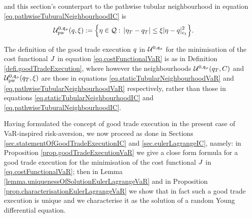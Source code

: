 \documentclass[10pt,a4paper]{article}
\begin{document}
	and  this section's counterpart to the pathwise tubular neighbourhood in equation \eqref{eq.pathwiseTuburalNeighbourhoodIC} is 
	\begin{equation}
	\begin{split}\label{eq.pathwiseTubularNeighbourhoodVaR}
	\mathcal{U}^{0,\mathfrak{q_0}}_{\text{pw}}(q,\xi):=
	\Big\lbrace
	\eta \in \mathcal{Q}: \, 
	\left\lvert {\eta_T-q_T} \right\rvert 
	&\leq \xi\lvert \eta - q\rvert ^{2}_{c_{1}}
	\Big\rbrace.
	\end{split}
	\end{equation}
	
	The definition of the good trade execution $q$ in $\mathcal{U}^{0,\mathfrak{q_0}}$ for the minimisation of the cost functional $J$ in equation \eqref{eq.costFunctionalVaR}  is as in Definition \ref{defi.goodTradeExecution}, where however the neighbourhoods $\mathcal{U}^{0,\mathfrak{q_0}} (q_T, C)$ and $\mathcal{U}^{0,\mathfrak{q_0}}_{\text{pw}}(q_T,\xi)$ are those in equations \eqref{eq.staticTubularNeighbourhoodVaR} and \eqref{eq.pathwiseTubularNeighbourhoodVaR} respectively, rather than those in equations \eqref{eq.staticTubularNeighbourhoodIC} and \eqref{eq.pathwiseTuburalNeighbourhoodIC}.
	
	Having formulated the concept of good trade execution in the present case of VaR-inspired risk-aversion, we now proceed as done in Sections \ref{sec.statementOfGoodTradeExecutionIC} and \ref{sec.eulerLagrangeIC}, namely: in Proposition \ref{prop.goodTradeExecutionVaR} we give a close form formula for a good trade execution for the minimisation of the cost functional $J$ in \eqref{eq.costFunctionalVaR}; then in Lemma \ref{lemma.uniquenessOfSolutionEulerLagrangeVaR} and in Proposition \ref{prop.characterisationEulerLagrangeVaR} we show that in fact such a good trade execution is unique and we characterise it as the solution of a random Young differential equation.	
	
\end{document}
